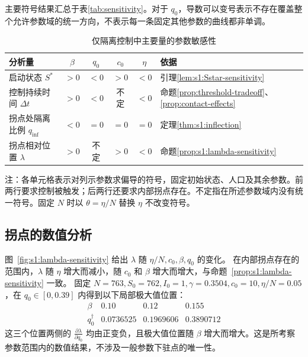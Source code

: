 \documentclass[lang=cn,a4paper,newtx]{elegantpaper}
\numberwithin{equation}{section}
\theoremstyle{plain}
\renewcommand{\arraystretch}{1.12}
\newcommand{\qinf}{q_{\mathrm{inf}}}
\begin{document}
主要符号结果汇总于表\ref{tab:sensitivity}。对于 $q_0$，导数可以变号表示不存在覆盖整个允许参数域的统一方向，不表示每一条固定其他参数的曲线都非单调。
\begin{table}[htbp]
\centering\small
\setlength{\tabcolsep}{3.5pt}
\renewcommand{\arraystretch}{1.25}
\begin{threeparttable}
\caption{仅隔离控制中主要量的参数敏感性}
\label{tab:sensitivity}\label{tab:s1:lambda-sensitivity}\label{tab:s1:inflection-roles}
\begin{tabularx}{\linewidth}{@{}Xccccp{.24\linewidth}@{}}
\toprule
分析量 & $\beta$ & $q_0$ & $c_0$ & $\eta$ & 依据\\
\midrule
启动状态 $S^*$ & $>0$ & $<0$ & $>0$ & $<0$ & 引理\ref{lem:s1:Sstar-sensitivity}\\
控制持续时间 $\Delta t$ & $>0$ & $<0$ & 不定 & $<0$ & 命题\ref{prop:threshold-tradeoff}、\ref{prop:contact-effects}\\
拐点处隔离比例 $\qinf$ & $<0$ & $=0$ & $=0$ & $=0$ & 定理\ref{thm:s1:inflection}\\
拐点相对位置 $\lambda$ & $>0$ & 不定 & $>0$ & $<0$ & 命题\ref{prop:s1:lambda-sensitivity}\\
\bottomrule
\end{tabularx}
\begin{tablenotes}[flushleft]\footnotesize
\item 注：各单元格表示对列示参数求偏导的符号，固定初始状态、人口及其余参数。前两行要求控制被触发；后两行还要求内部拐点存在。不定指在所述参数域内没有统一符号。固定 $N$ 时以 $\theta=\eta/N$ 替换 $\eta$ 不改变符号。
\end{tablenotes}
\end{threeparttable}
\end{table}


\subsection{拐点的数值分析}

图~\ref{fig:s1:lambda-sensitivity} 给出 $\lambda$ 随 $\eta/N,c_0,\beta,q_0$ 的变化。
在内部拐点存在的范围内，$\lambda$ 随 $\eta$ 增大而减小，随 $c_0$ 和 $\beta$ 增大而增大，与命题~\ref{prop:s1:lambda-sensitivity} 一致。
固定 $N=763,S_0=762,I_0=1,\gamma=0.3504,c_0=10,\eta/N=0.05$，在 $q_0\in[0,0.39]$ 内得到以下局部极大值位置：
\[
\begin{array}{c|ccc}
\beta & 0.10 & 0.12 & 0.155\\
\hline
q_0^\dagger
&0.0736525&0.1969606&0.3890712
\end{array}
\]
这三个位置两侧的 $\frac{\partial \lambda}{\partial q_0}$ 均由正变负，且极大值位置随 $\beta$ 增大而增大。这是所考察参数范围内的数值结果，不涉及一般参数下驻点的唯一性。
\end{document}
